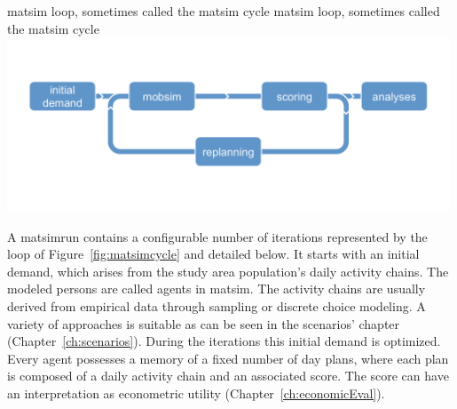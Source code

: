 \createfigure%
{\protect\gls{matsim} loop, sometimes called the \protect\gls{matsim} cycle}%
{\protect\gls{matsim} loop, sometimes called the \protect\gls{matsim} cycle %
}
{\label{fig:matsimcycle}}%
{\includegraphics[width=0.99\textwidth, angle=0]{figures/matsimcycle.pdf}}%
{}

A \gls{matsimrun} contains a configurable number of iterations represented by the loop of Figure~\ref{fig:matsimcycle} and detailed below. 
%
It starts with an initial demand, which arises from the \gls{study} area population's daily activity chains. The modeled persons are called agents in \gls{matsim}. The activity chains are usually derived from empirical data through sampling or discrete choice modeling. A variety of approaches is suitable as can be seen in the scenarios' chapter (Chapter~\ref{ch:scenarios}). During the iterations this initial demand is optimized. Every agent possesses a memory of a fixed number of day plans, where each \gls{plan} is composed of a daily activity chain and an associated \gls{score}.  The score can have an interpretation as econometric utility (\cf Chapter~\ref{ch:economicEval}).

